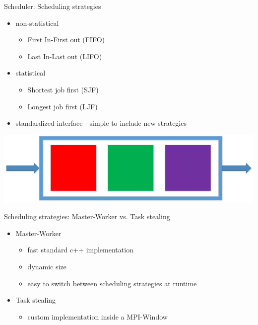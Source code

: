 	\begin{frame}{Scheduler: Scheduling strategies}
	\begin{minipage}[]{.7\textwidth}%
			\begin{itemize}
		\item<2-> non-statistical
		\begin{itemize}
			\item First In-First out (FIFO)
			\item Last In-Last out (LIFO)
		\end{itemize}
		\item<3-> statistical
		\begin{itemize}
			\item Shortest job first (SJF)
			\item Longest job first (LJF)
		\end{itemize}
		\item<4-> standardized interface - simple to include new strategies
		\end{itemize}
\end{minipage}%
\begin{minipage}[]{.3\textwidth}%
  \includegraphics[width=\textwidth]{images/fifo}%
\end{minipage}		
		
	\end{frame}
	\begin{frame}{Scheduling strategies: Master-Worker vs. Task stealing}
		\begin{itemize}
			\item<2-> Master-Worker
				\begin{itemize}
					\item fast standard c++ implementation
					\item dynamic size
					\item easy to switch between scheduling strategies at runtime	
				\end{itemize}
			
			\item<3-> Task stealing
					\begin{itemize}
						\item custom implementation inside a MPI-Window
					\end{itemize}
			
		\end{itemize}
	\end{frame}